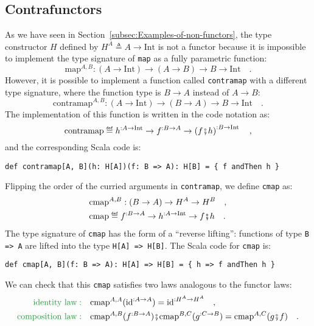\subsection{Contrafunctors\label{subsec:Contrafunctors}}

As we have seen in Section~\ref{subsec:Examples-of-non-functors},
the type constructor $H$ defined by $H^{A}\triangleq A\rightarrow\text{Int}$
is not a functor because it is impossible to implement the type signature
of \lstinline!map! as a fully parametric function:
\[
\text{map}^{A,B}:\left(A\rightarrow\text{Int}\right)\rightarrow\left(A\rightarrow B\right)\rightarrow B\rightarrow\text{Int}\quad.
\]
However, it is possible to implement a function called \lstinline!contramap!
with a different type signature, where the function type is $B\rightarrow A$
instead of $A\rightarrow B$: 
\[
\text{contramap}^{A,B}:\left(A\rightarrow\text{Int}\right)\rightarrow\left(B\rightarrow A\right)\rightarrow B\rightarrow\text{Int}\quad.
\]
The implementation of this function is written in the code notation
as:
\[
\text{contramap}\triangleq h^{:A\rightarrow\text{Int}}\rightarrow f^{:B\rightarrow A}\rightarrow\left(f\bef h\right)^{:B\rightarrow\text{Int}}\quad,
\]
and the corresponding Scala code is:
\begin{lstlisting}
def contramap[A, B](h: H[A])(f: B => A): H[B] = { f andThen h }
\end{lstlisting}
Flipping the order of the curried arguments in \lstinline!contramap!,
we define \lstinline!cmap! as:
\begin{align}
 & \text{cmap}^{A,B}:\left(B\rightarrow A\right)\rightarrow H^{A}\rightarrow H^{B}\quad,\nonumber \\
 & \text{cmap}\triangleq f^{:B\rightarrow A}\rightarrow h^{:A\rightarrow\text{Int}}\rightarrow f\bef h\quad.\label{eq:f-example-1-contrafmap}
\end{align}
The type signature of \lstinline!cmap! has the form of a \textsf{``}reverse
lifting\textsf{''}: functions of type \lstinline!B => A! are lifted into
the type \lstinline!H[A] => H[B]!. The Scala code for \lstinline!cmap!
is:
\begin{lstlisting}
def cmap[A, B](f: B => A): H[A] => H[B] = { h => f andThen h } 
\end{lstlisting}
We can check that this \lstinline!cmap! satisfies two laws analogous
to the functor laws:
\begin{align*}
{\color{greenunder}\text{identity law}:}\quad & \text{cmap}^{A,A}(\text{id}^{:A\rightarrow A})=\text{id}^{:H^{A}\rightarrow H^{A}}\quad,\\
{\color{greenunder}\text{composition law}:}\quad & \text{cmap}^{A,B}(f^{:B\rightarrow A})\bef\text{cmap}^{B,C}(g^{:C\rightarrow B})=\text{cmap}^{A,C}(g\bef f)\quad.
\end{align*}
